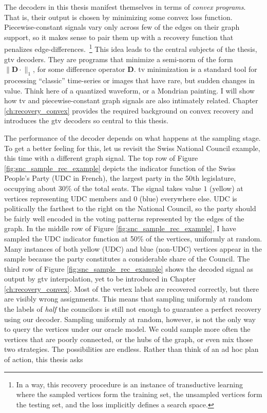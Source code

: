 The decoders in this thesis manifest themselves in terms of \emph{convex programs}. That is, their output is chosen by minimizing some convex loss function. Piecewise-constant signals vary only across few of the edges on their graph support, so it makes sense to pair them up with a recovery function that penalizes edge-differences.~\footnote{In a way, this recovery procedure is an instance of transductive learning \cite[Chapter 24]{chapelle2006} where the sampled vertices form the training set, the unsampled vertices form the testing set, and the loss implicitly defines a search space.} This idea leads to the central subjects of the thesis, \acrfull{gtv} decoders. They are programs that minimize a semi-norm of the form $\|\mathbf{D} \cdot\|_1$, for some difference operator $\mathbf{D}$. \acrfull{tv} minimization is a standard tool for processing ``classic'' time-series or images that have rare, but sudden changes in value. Think here of a quantized waveform, or a Mondrian painting. I will show how \acrshort{tv} and piecewise-constant graph signals are also intimately related. Chapter \ref{ch:recovery_convex} provides the required background on convex recovery and introduces the \acrshort{gtv} decoders so central to this thesis.

The performance of the decoder depends on what happens at the sampling stage. To get a better feeling for this, let us revisit the Swiss National Council example, this time with a different graph signal. The top row of Figure \ref{fig:snc_sample_rec_example} depicts the indicator function of the Swiss People's Party (UDC in French), the largest party in the 50th legislature, occupying about 30\% of the total seats. The signal takes value $1$ (yellow) at vertices representing UDC members and $0$ (blue) everywhere else. UDC is politically the farthest to the right on the National Council, so the party should be fairly well encoded in the voting patterns represented by the edges of the graph. In the middle row of Figure \ref{fig:snc_sample_rec_example}, I have sampled the UDC indicator function at 50\% of the vertices, uniformly at random. Many instances of both yellow (UDC) and blue (non-UDC) vertices appear in the sample because the party constitutes a considerable share of the Council. The third row of Figure \ref{fig:snc_sample_rec_example} shows the decoded signal as output by \acrshort{gtv} interpolation, yet to be introduced in Chapter \ref{ch:recovery_convex}. Most of the vertex labels are recovered correctly, but there are visibly wrong assignments. This means that sampling uniformly at random the labels of \emph{half} the councilors is still not enough to guarantee a perfect recovery using our decoder. Sampling uniformly at random, however, is not the only way to query the vertices under our oracle model. We could sample more often the vertices that are poorly connected, or the hubs of the graph, or even mix those two strategies. The possibilities are endless. Rather than think of an ad hoc plan of action, this thesis asks

